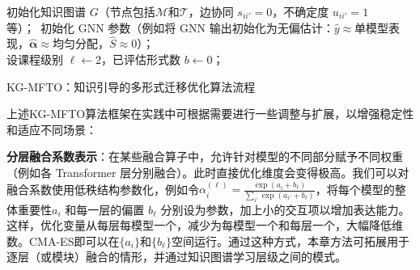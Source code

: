 \documentclass[../main.tex]{subfiles}
\begin{document}
\begin{algorithm}[tb]
	\small
	\DontPrintSemicolon
	初始化知识图谱 $G$（节点包括$\mathcal{M}$和$\mathcal{T}$，边协同 $s_{ii'}=0$，不确定度 $u_{ii'}=1$ 等）；\ 初始化 GNN 参数（例如将 GNN 输出初始化为无偏估计：$\hat{y}\approx$单模型表现，$\hat{\boldsymbol{\alpha}}\approx$均匀分配，$\hat{S}\approx 0$）；\\
	设课程级别 $\ell\leftarrow 2$，已评估形式数 $b\leftarrow 0$；\\
	\caption{KG-MFTO：知识引导的多形式迁移优化算法流程}
	\label{alg:kg-mfto}
\end{algorithm}

\label{sec:ch5-5-4-practical-considerations-extensions}
上述KG-MFTO算法框架在实践中可根据需要进行一些调整与扩展，以增强稳定性和适应不同场景：

\textbf{分层融合系数表示}：在某些融合算子中，允许针对模型的不同部分赋予不同权重（例如各 Transformer 层分别融合）。此时直接优化维度会变得极高。我们可以对融合系数使用低秩结构参数化，例如令$\alpha^{(\ell)}_i = \frac{\exp(a_i + b_\ell)}{\sum_{i'} \exp(a_{i'} + b_\ell)}$，将每个模型的整体重要性$ a_i$ 和每一层的偏置 $b_\ell$ 分别设为参数，加上小的交互项以增加表达能力。这样，优化变量从每层每模型一个，减少为每模型一个和每层一个，大幅降低维数。CMA-ES即可以在$\{a_i\}$和$\{b_\ell\}$空间运行。通过这种方式，本章方法可拓展用于逐层（或模块）融合的情形，并通过知识图谱学习层级之间的模式。
\end{document}
